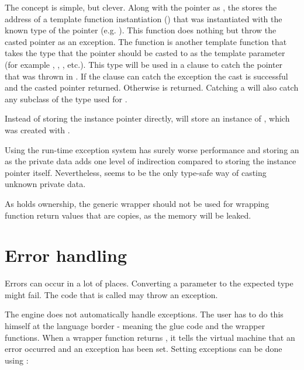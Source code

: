 The concept is simple, but clever. Along with the pointer as , the  stores the address of a template function instantiation () that was instantiated with the known type of the pointer (e.g. ). This function does nothing but throw the casted pointer as an exception. The  function is another template function that takes the type that the pointer should be casted to as the template parameter  (for example , , , etc.). This type will be used in a  clause to catch the pointer that was thrown in . If the  clause can catch the exception the cast is successful and the casted pointer returned. Otherwise  is returned. Catching a  will also catch any subclass of the type used for .

Instead of storing the instance pointer directly,  will store an instance of , which was created with . 

Using the run-time exception system has surely worse performance and storing an  as the private data adds one level of indirection compared to storing the instance pointer itself. Nevertheless,  seems to be the only type-safe way of casting unknown private data.

As  holds ownership, the generic wrapper should not be used for wrapping function return values that are copies, as the memory will be leaked.

\section{Error handling}
\label{sec:ErrorHandling}

Errors can occur in a lot of places. Converting a parameter to the expected type might fail. The  code that is called may throw an exception.

The  engine does not automatically handle exceptions. The  user has to do this himself at the language border - meaning the glue code and the wrapper functions. When a wrapper function returns , it tells the virtual machine that an error occurred and an exception has been set. Setting exceptions can be done using :

